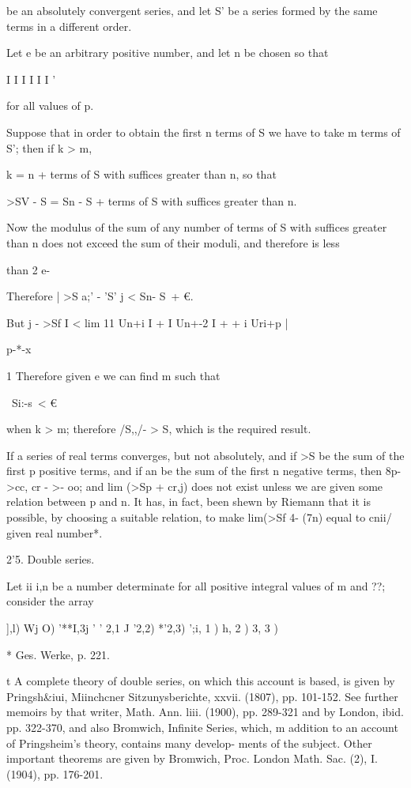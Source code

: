 %
%

be an absolutely convergent series, and let S' be a series formed by
the same terms in a different order.

Let e be an arbitrary positive number, and let n be chosen so that

I I I I I I '

for all values of p.

Suppose that in order to obtain the first n terms of S we have to take
m terms of S'; then if k > m,

 k = n + terms of S with suffices greater than n, so that

>SV - S = Sn - S + terms of S with suffices greater than n.

Now the modulus of the sum of any number of terms of S with suffices
greater than n does not exceed the sum of their moduli, and therefore
is less

than 2 e-

Therefore | >S a;' - 'S' j < Sn- S\ + €.

But j - >Sf I < lim 11 Un+i I + I Un+-2 I +    + i Uri+p |

p-*-x

1 Therefore given e we can find m such that

\ Si:-s\ < €

when k > m; therefore /S,,/- > S, which is the required result.

If a series of real terms converges, but not absolutely, and if >S be
the sum of the first p positive terms, and if an be the sum of the
first n negative terms, then 8p->cc, cr - >- oo; and lim (>Sp + cr,j)
does not exist unless we are given some relation between p and n. It
has, in fact, been shewn by Riemann that it is possible, by choosing a
suitable relation, to make lim(>Sf 4- (7n) equal to cnii/ given real
number*.

2'5. Double series.

Let ii i,n be a number determinate for all positive integral values of
m and ??; consider the array

 ],l) Wj O) '**I,3j  ' ' 2,1 J '2,2) *'2,3)   ';i, 1 ) h, 2 ) 3,
3 )   

* Ges. Werke, p. 221.

t A complete theory of double series, on which this account is based,
is given by Pringsh\&iui, Miinchcner Sitzunysberichte, xxvii. (1807),
pp. 101-152. See further memoirs by that writer, Math. Ann. liii.
(1900), pp. 289-321 and by London, ibid. pp. 322-370, and also
Bromwich, Infinite Series, which, m addition to an account of
Pringsheim's theory, contains many develop- ments of the subject.
Other important theorems are given by Bromwich, Proc. London Math.
Sac. (2), I. (1904), pp. 176-201.

